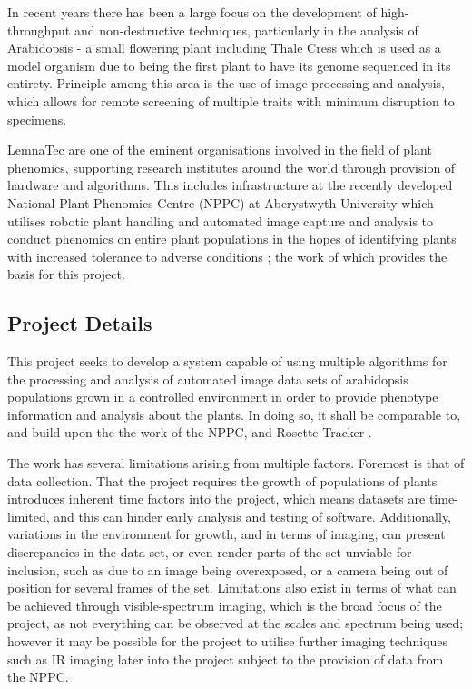 \documentclass[11pt,fleqn,twoside]{article}
\begin{document}
In recent years there has been a large focus on the development of high-throughput and non-destructive techniques, particularly in the analysis of Arabidopsis - a small flowering plant including Thale Cress which is used as a model organism due to being the first plant to have its genome sequenced in its entirety\cite{AGI2000}. Principle among this area is the use of image processing and analysis, which allows for remote screening of multiple traits with minimum disruption to specimens. \cite{DeVylder01112012}

LemnaTec are one of the eminent organisations involved in the field of plant phenomics, supporting research institutes around the world through provision of hardware and algorithms. This includes infrastructure at the recently developed National Plant Phenomics Centre (NPPC) at Aberystwyth University which utilises robotic plant handling and automated image capture and analysis to conduct phenomics on entire plant populations in the hopes of identifying plants with increased tolerance to adverse conditions \cite{IBERSnppc}; the work of which provides the basis for this project.

\subsection{Project Details}
This project seeks to develop a system capable of using multiple algorithms for the processing and analysis of automated image data sets of arabidopsis populations grown in a controlled environment in order to provide phenotype information and analysis about the plants. In doing so, it shall be comparable to, and build upon the  the work of the NPPC, and Rosette Tracker \cite{DeVylder01112012}.

The work has several limitations arising from multiple factors. Foremost is that of data collection. That the project requires the growth of populations of plants introduces inherent time factors into the project, which means datasets are time-limited, and this can hinder early analysis and testing of software. Additionally, variations in the environment for growth, and in terms of imaging, can present discrepancies in the data set, or even render parts of the set unviable for inclusion, such as due to an image being overexposed, or a camera being out of position for several frames of the set. Limitations also exist in terms of what can be achieved through visible-spectrum imaging, which is the broad focus of the project, as not everything can be observed at the scales and spectrum being used; however it may be possible for the project to utilise further imaging techniques such as IR imaging later into the project subject to the provision of data from the NPPC.
\end{document}
